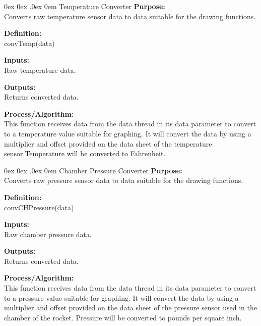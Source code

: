 \documentclass[10pt,draftclsnofoot,onecolumn,compsoc]{IEEEtran}
\makeatletter
\renewcommand\paragraph{\@startsection{paragraph}{4}{\z@}%
                                    {0ex \@plus0ex \@minus.0ex}%
                                    {0em}%
                                    {\normalfont\normalsize\bfseries}}
\makeatother
\begin{document}
\paragraph{Temperature Converter}
{\bf Purpose:} \\
Converts raw temperature sensor data to data suitable for the drawing functions.  \par
{\bf Definition:} \\ 
convTemp(data) \par
{\bf Inputs:} \\ Raw temperature data. \par
{\bf Outputs:} \\ Returns converted data. \par
{\bf Process/Algorithm:} \\
This function receives data from the data thread in its data parameter to convert to a temperature value suitable for graphing. It will convert the data by using a multiplier and offset provided on the data sheet of the temperature sensor.Temperature will be converted to Fahrenheit. \par

\paragraph{Chamber Pressure Converter}
{\bf Purpose:} \\
Converts raw pressure sensor data to data suitable for the drawing functions.  \par
{\bf Definition:} \\ 
convCHPressure(data) \par
{\bf Inputs:} \\ Raw chamber pressure data. \par
{\bf Outputs:} \\ Returns converted data. \par
{\bf Process/Algorithm:} \\
This function receives data from the data thread in its data parameter to convert to a pressure value suitable for graphing. It will convert the data by using a multiplier and offset provided on the data sheet of the pressure sensor used in the chamber of the rocket. Pressure will be converted to pounds per square inch. \par
\end{document}
